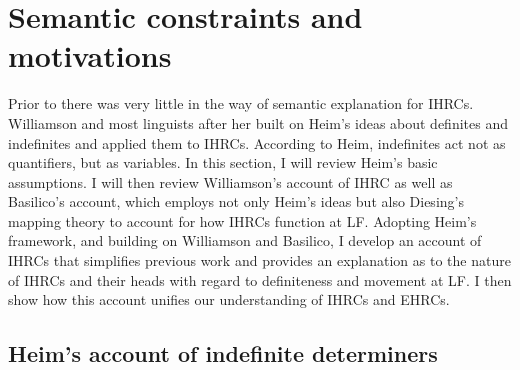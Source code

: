 \documentclass[output=paper]{LSP/langsci}
\begin{document}
\ea\label{boyle38}
{\hspace{1em}}\newline

\z          
      
\section{Semantic constraints and motivations}\label{sec:boyle:6}

Prior to \citet{Williamson1987} there was very little in the way of semantic explanation for IHRCs. Williamson and most linguists after her built on Heim's \citeyearpar{Heim1982} ideas about definites and indefinites and applied them to IHRCs. According to Heim, indefinites act not as quantifiers, but as variables.  In this section, I will review Heim's basic assumptions. I will then review Williamson's account of IHRC \citeyearpar{Williamson1987} as well as Basilico's \citeyear{Basilico1996} account, which employs not only Heim's ideas but also Diesing's mapping theory \citeyearpar{Diesing1990, Diesing1992a, Diesing1992b} to account for how IHRCs function at LF. Adopting Heim's framework, and building on Williamson and Basilico, I develop an account of IHRCs that simplifies previous work and provides an explanation as to the nature of IHRCs and their heads with regard to definiteness and movement at LF. I then show how this account unifies our understanding of IHRCs and EHRCs.

\subsection{Heim's account of indefinite determiners}\label{sec:boyle:6.1}
\end{document}
